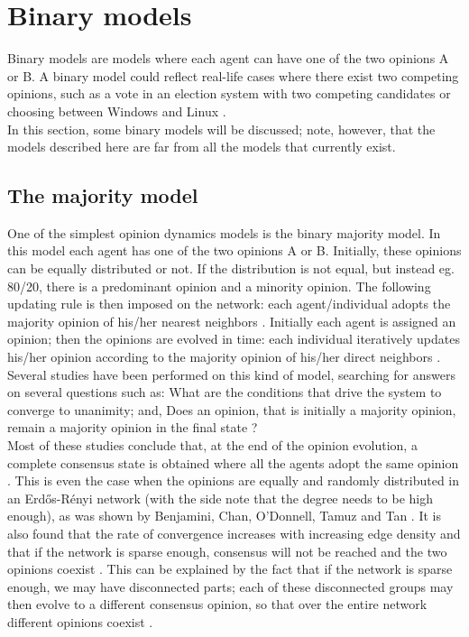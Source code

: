 \documentclass[11 pt , letterpaper , twoside , openright]{book}
\begin{document}
\section{Binary models}\label{Bin}

Binary models are models where each agent can have one of the two opinions A or B. A binary model could reflect real-life cases where there exist two competing opinions, such as a vote in an election system with two competing candidates or choosing between Windows and Linux \cite{Nguyen2020}.\\
\newline
In this section, some binary models will be discussed; note, however, that the models described here are far from all the models that currently exist.

\subsection{The majority model}\label{majModel}

One of the simplest opinion dynamics models is the binary majority model. In this model each agent has one of the two opinions A or B. Initially, these opinions can be equally distributed or not. If the distribution is not equal, but instead eg. 80/20, there is a predominant opinion and a minority opinion. The following updating rule is then imposed on the network: each agent/individual adopts the majority opinion of his/her nearest neighbors \cite{Nguyen2020}. Initially each agent is assigned an opinion; then the opinions are evolved in time: each individual iteratively updates his/her opinion according to the majority opinion of his/her direct neighbors \cite{Nguyen2020}.\\
\newline
Several studies have been performed on this kind of model, searching for answers on several questions such as: What are the conditions that drive the system to converge to unanimity; and, Does an opinion, that is initially a majority opinion, remain a majority opinion in the final state \cite{Nguyen2020}? \\
\newline
Most of these studies conclude that, at the end of the opinion evolution, a complete consensus state is obtained where all the agents adopt the same opinion \cite{Nguyen2020}. This is even the case when the opinions are equally and randomly distributed in an Erd\H{o}s-R\'{e}nyi network (with the side note that the degree needs to be high enough), as was shown by Benjamini, Chan, O'Donnell, Tamuz and Tan \cite{Benjamini2016}. It is also found that the rate of convergence increases with increasing edge density and that if the network is sparse enough, consensus will not be reached and the two opinions coexist \cite{Nguyen2020}. This can be explained by the fact that if the network is sparse enough, we may have disconnected parts; each of these disconnected groups may then evolve to a different consensus opinion, so that over the entire network different opinions coexist \cite{Nguyen2020}.
\end{document}
